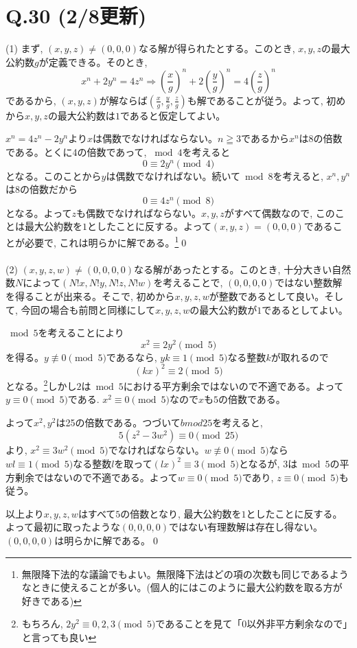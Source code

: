 \documentclass[twocolumn]{jbook}
\theoremstyle{definition}
\newcommand{\nara}{\Rightarrow}
\renewcommand{\geq}{\geqq}
\newcommand{\parena}[1]{\left( #1\right)}
\begin{document}
\section*{Q.30 (2/8更新)}
(1) まず, $(x,y,z)\neq (0,0,0)$なる解が得られたとする。このとき, $x,y,z$の最大公約数$g$が定義できる。そのとき, 
\[x^n + 2y^n = 4z^n \nara \parena{\dfrac{x}{g}}^n + 2\parena{\dfrac{y}{g}}^n = 4\parena{\dfrac{z}{g}}^n \]
であるから, $(x,y,z)$が解ならば$(\frac{x}{g}, \frac{y}{g}, \frac{z}{g})$も解であることが従う。よって, 初めから$x,y,z$の最大公約数は$1$であると仮定してよい。\par
 $x^n = 4z^n - 2y^n$より$x$は偶数でなければならない。$n\geq 3$であるから$x^n$は$8$の倍数である。とくに4の倍数であって, $\bmod{4}$を考えると
\[0 \equiv 2y^n\pmod{4}\]
となる。このことから$y$は偶数でなければない。続いて$\bmod{8}$を考えると, $x^n,y^n$は$8$の倍数だから
\[0\equiv 4z^n\pmod{8}\]
となる。よって$z$も偶数でなければならない。$x,y,z$がすべて偶数なので, このことは最大公約数を$1$としたことに反する。よって$(x,y,z) = (0,0,0)$であることが必要で, これは明らかに解である。\footnote{無限降下法的な議論でもよい。無限降下法はどの項の次数も同じであるようなときに使えることが多い。(個人的にはこのように最大公約数を取る方が好きである)}\qed\\
\\
(2) $(x,y,z,w) \neq (0,0,0,0)$なる解があったとする。このとき, 十分大きい自然数$N$によって$(N!x, N!y, N!z, N!w)$を考えることで, $(0,0,0,0)$ではない整数解を得ることが出来る。そこで, 初めから$x,y,z,w$が整数であるとして良い。そして, 今回の場合も前問と同様にして$x,y,z,w$の最大公約数が$1$であるとしてよい。\par
$\bmod{5}$を考えることにより
\[x^2 \equiv 2y^2\pmod{5}\]
を得る。$y\not\equiv 0\pmod{5}$であるなら, $yk\equiv 1\pmod{5}$なる整数$k$が取れるので
\[(kx)^2 \equiv 2\pmod{5}\]
となる。\footnote{もちろん, $2y^2\equiv 0,2,3\pmod{5}$であることを見て「$0$以外非平方剰余なので」と言っても良い}しかし$2$は$\bmod{5}$における平方剰余ではないので不適である。よって$y\equiv 0\pmod{5}$である. $x^2 \equiv 0\pmod{5}$なので$x$も$5$の倍数である。\par
よって$x^2, y^2$は25の倍数である。つづいて$bmod{25}$を考えると, 
\[5(z^2 - 3w^2)\equiv 0\pmod{25}\]
より, $x^2 \equiv 3w^2 \pmod{5}$でなければならない。$w\not\equiv 0\pmod{5}$なら$wl\equiv 1\pmod{5}$なる整数$l$を取って$(lx)^2\equiv 3\pmod{5}$となるが, $3$は$\bmod{5}$の平方剰余ではないので不適である。よって$w\equiv 0\pmod{5}$であり, $z\equiv 0\pmod{5}$も従う。\par
以上より$x,y,z,w$はすべて$5$の倍数となり, 最大公約数を$1$としたことに反する。よって最初に取ったような$(0,0,0,0)$ではない有理数解は存在し得ない。$(0,0,0,0)$は明らかに解である。\qed
\end{document}
